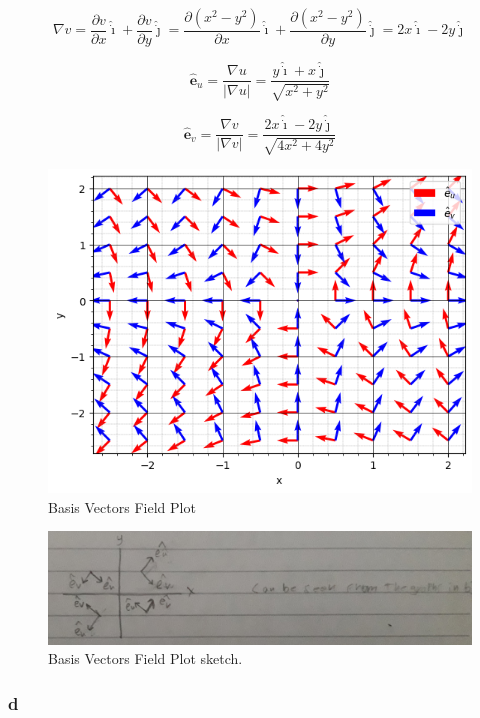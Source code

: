 \documentclass[12pt]{article}
\begin{document}
\[
    \nabla v = \frac{ \partial v}{\partial x} \hat{\dot{\imath}}
    + \frac{ \partial v}{\partial y}  \hat{\dot{\jmath}}
    = \frac{ \partial (x^2 - y^2)}{\partial x}  \hat{\dot{\imath}}
    + \frac{ \partial (x^2 - y^2)}{\partial y}  \hat{\dot{\jmath}}
    = 2x  \hat{\dot{\imath}} - 2y  \hat{\dot{\jmath}}
\]

\[
    \hat{\mathbf{e}}_u = \frac{\nabla u}{|\nabla u|} = \frac{y  \hat{\dot{\imath}}
        + x  \hat{\dot{\jmath}}}{\sqrt{x^2 + y^2}}
\]

\[
    \hat{\mathbf{e}}_v = \frac{\nabla v}{|\nabla v|} = \frac{2x  \hat{\dot{\imath}}
        - 2y  \hat{\dot{\jmath}}}{\sqrt{4x^2 + 4y^2}}
\]

\begin{figure}[H]
    \includegraphics[width=\linewidth]{Q1C.png}
    \caption{Basis Vectors Field Plot}\label{fig:Q1C}
\end{figure}

\begin{figure}[H]
    \includegraphics[width=\linewidth]{Q1C.jpg}
    \caption{Basis Vectors Field Plot sketch.}\label{fig:Q1C2}
\end{figure}

\subsubsection{d}
\end{document}
